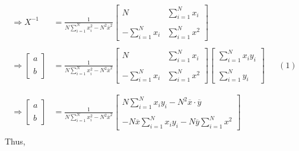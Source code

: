\documentclass[10pt, twocolumn]{article}
\begin{document}
\begin{align*}
	\Rightarrow 
	X^{-1} &= \frac{1}{N\sum_{i=1}^{N}x_i^2 - N^2\overline{x}^2}
	\begin{bmatrix}
		N					&	\sum_{i=1}^{N}x_i\\\\
		-\sum_{i=1}^{N}x_i	&	\sum_{i=1}^{N}x^2
	\end{bmatrix}\\\\
	\Rightarrow
	\begin{bmatrix}
	a\\\\
	b
	\end{bmatrix}
	&= 	\frac{1}{N\sum_{i=1}^{N}x_i^2 - N^2\overline{x}^2}
	\begin{bmatrix}
		N					&	\sum_{i=1}^{N}x_i\\\\
		-\sum_{i=1}^{N}x_i	&	\sum_{i=1}^{N}x^2
	\end{bmatrix}
	\begin{bmatrix}
		\sum_{i=1}^{N}x_iy_i\\\\
		\sum_{i=1}^{N}y_i
	\end{bmatrix} &&(1)\\\\\\
	\Rightarrow
	\begin{bmatrix}
	a\\\\
	b
	\end{bmatrix}
	&= \frac{1}{N\sum_{i=1}^{N}x_i^2 - N^2\overline{x}^2}
	\begin{bmatrix}
		N\sum_{i=1}^{N}x_iy_i	-	N^2\overline{x} \cdot\overline{y}\\\\
		-N\overline{x}\sum_{i=1}^{N}x_iy_i	-	N\overline{y}\sum_{i=1}^{N}x^2
	\end{bmatrix}\\
\end{align*}
Thus,
\end{document}
